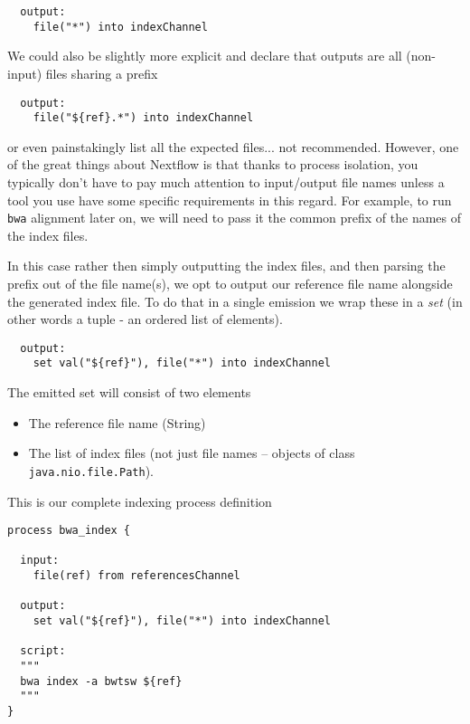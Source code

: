 \begin{lstlisting}
  output:
    file("*") into indexChannel 
\end{lstlisting}

We could also be slightly more explicit and declare that outputs are all (non-input)
files sharing a prefix

\begin{lstlisting}
  output:
    file("${ref}.*") into indexChannel 
\end{lstlisting}

or even painstakingly list all the expected files... not recommended.
%
%
%
However, one of the great things about Nextflow is that thanks to process isolation, 
you typically don't have to pay much attention to input/output file names 
unless a tool you use have some specific requirements in this regard.
For example, to run \texttt{bwa} alignment later on, we will need to pass it 
the common prefix of the names of the index files. 

In this case rather then simply outputting the index files,
and then parsing the prefix out of the file name(s), 
we opt to output our reference file name alongside the generated index file.
To do that in a single emission we wrap these in a \emph{set} 
(in other words a tuple - an ordered list of elements).

\begin{lstlisting}
  output:
    set val("${ref}"), file("*") into indexChannel 
\end{lstlisting}

The emitted set will consist of two elements 
\begin{itemize}
\item The reference file name (String) 
\item The list of index files (not just file names -- objects of class \texttt{java.nio.file.Path}).
\end{itemize}

This is our complete indexing process definition 
\begin{lstlisting}
process bwa_index {
  
  input:
    file(ref) from referencesChannel
  
  output:
    set val("${ref}"), file("*") into indexChannel 
    
  script:
  """
  bwa index -a bwtsw ${ref}
  """
}  
\end{lstlisting}

